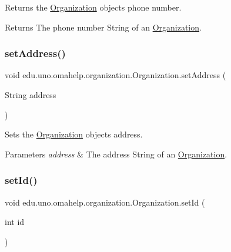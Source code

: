 Returns the \mbox{\hyperlink{classedu_1_1uno_1_1omahelp_1_1organization_1_1_organization}{Organization}} object\textquotesingle{}s phone number.

\begin{DoxyReturn}{Returns}
The phone number String of an \mbox{\hyperlink{classedu_1_1uno_1_1omahelp_1_1organization_1_1_organization}{Organization}}. 
\end{DoxyReturn}
\mbox{\label{classedu_1_1uno_1_1omahelp_1_1organization_1_1_organization_ad8d0c35f8b17c27471984b54a0d6d6a0}} 
\subsubsection{\texorpdfstring{set\+Address()}{setAddress()}}
{\footnotesize\ttfamily void edu.\+uno.\+omahelp.\+organization.\+Organization.\+set\+Address (\begin{DoxyParamCaption}\item[{String}]{address }\end{DoxyParamCaption})}

Sets the \mbox{\hyperlink{classedu_1_1uno_1_1omahelp_1_1organization_1_1_organization}{Organization}} object\textquotesingle{}s address.


\begin{DoxyParams}{Parameters}
{\em address} & The address String of an \mbox{\hyperlink{classedu_1_1uno_1_1omahelp_1_1organization_1_1_organization}{Organization}}. \\
\hline
\end{DoxyParams}
\mbox{\label{classedu_1_1uno_1_1omahelp_1_1organization_1_1_organization_a07240d703aa44148f50d70d168c34967}} 
\subsubsection{\texorpdfstring{set\+Id()}{setId()}}
{\footnotesize\ttfamily void edu.\+uno.\+omahelp.\+organization.\+Organization.\+set\+Id (\begin{DoxyParamCaption}\item[{int}]{id }\end{DoxyParamCaption})}

